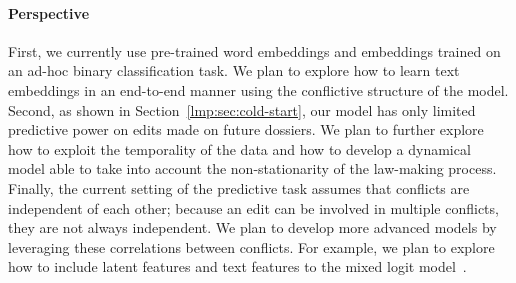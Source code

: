 \paragraph{Perspective}
First, we currently use pre-trained word embeddings and embeddings trained on an ad-hoc binary classification task.
We plan to explore how to learn text embeddings in an end-to-end manner using the conflictive structure of the \warofwords{} model.
Second, as shown in Section~\ref{lmp:sec:cold-start}, our model has only limited predictive power on edits made on future dossiers.
We plan to further explore how to exploit the temporality of the data and how to develop a dynamical model able to take into account the non-stationarity of the law-making process.
Finally, the current setting of the predictive task assumes that conflicts are independent of each other; because an edit can be involved in multiple conflicts, they are not always independent.
We plan to develop more advanced models by leveraging these correlations between conflicts.
For example, we plan to explore how to include latent features and text features to the mixed logit model~\citep{hensher2003mixed}.
